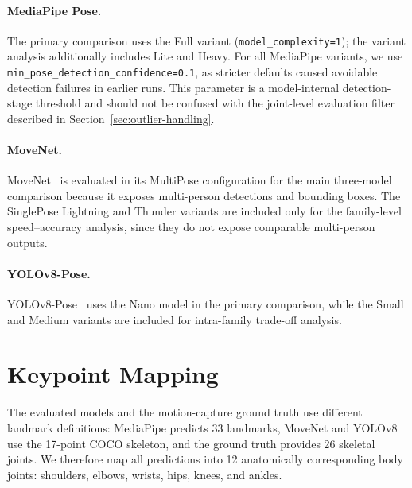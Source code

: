 \paragraph{MediaPipe Pose.}
The primary comparison uses the Full variant (\texttt{model\_complexity=1}); the variant analysis additionally includes Lite and Heavy. For all MediaPipe variants, we use \texttt{min\_pose\_detection\_confidence=0.1}, as stricter defaults caused avoidable detection failures in earlier runs. This parameter is a model-internal detection-stage threshold and should not be confused with the joint-level evaluation filter described in Section~\ref{sec:outlier-handling}.

\paragraph{MoveNet.}
MoveNet~\cite{google2021movenet} is evaluated in its MultiPose configuration for the main three-model comparison because it exposes multi-person detections and bounding boxes. The SinglePose Lightning and Thunder variants are included only for the family-level speed--accuracy analysis, since they do not expose comparable multi-person outputs.

\paragraph{YOLOv8-Pose.}
YOLOv8-Pose~\cite{jocher2023yolov8} uses the Nano model in the primary comparison, while the Small and Medium variants are included for intra-family trade-off analysis.

\section{Keypoint Mapping}
\label{sec:keypoint-mapping}

The evaluated models and the motion-capture ground truth use different landmark definitions: MediaPipe predicts 33 landmarks, MoveNet and YOLOv8 use the 17-point COCO skeleton, and the ground truth provides 26 skeletal joints. We therefore map all predictions into 12 anatomically corresponding body joints: shoulders, elbows, wrists, hips, knees, and ankles.

